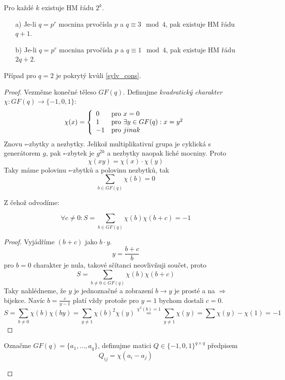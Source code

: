 \begin{consequence}
    Pro každé $k$ existuje HM řádu $2^k$.
\end{consequence}
\begin{theorem}
    \begin{itemize}
        \item[a)] Je-li $q=p^r$ mocnina prvočísla $p$ a $q\equiv 3\mod 4$, pak existuje HM řádu $q+1$.
        \item[b)] Je-li $q=p^r$ mocnina prvočísla $p$ a $q\equiv 1\mod 4$, pak existuje HM řádu $2q+2$.
    \end{itemize}
    Případ pro $q = 2$ je pokrytý kvůli \cref{sylv_cons}.
\end{theorem}
\begin{proof}
	Vezměme konečné těleso $GF(q)$.
	Definujme \emph{kvadratický charakter} $\chi:GF(q) \to \{ -1, 0, 1 \}$:
	\[ \chi(x) = \left\{ \begin{array}{lll} 0 & \mbox{pro } x = 0 \\ 1 & \mbox{pro } \exists y \in GF(q): x = y^2 \\ -1 & \mbox{pro } jinak \end{array} \right. \]
	Znovu $\square$-zbytky a nezbytky.
	Jelikož multiplikativní grupa je cyklická s generátorem $g$, pak $\square$-zbytek je $g^{2k}$ a nezbytky naopak liché mocniny.
	Proto
	\[ \chi (xy) = \chi(x) \cdot \chi(y) \]
	Taky máme polovinu $\square$-zbytků a polovinu nezbytků, tak
	\begin{equation}\label{chi_all}
		\sum_{b \in GF(q)} \chi(b) = 0
	\end{equation}

	Z čehož odvodíme:
	\begin{lemma}\label{chi_lemma}
		\[ \forall c \ne 0: S = \sum_{b \in GF(q)} \chi(b) \chi(b + c)= -1 \]
	\end{lemma}
	\begin{proof}
		Vyjádříme $(b + c)$ jako $b \cdot y$.
		\[ y = \frac{b + c}{b} \]
		pro $b = 0$ charakter je nula, takové sčítanci neovlivňuji součet, proto
		\[ S = \sum_{b \ne 0 \in GF(q)} \chi(b) \chi(b + c) \]
		Taky nahlédneme, že $y$ je jednoznačné a zobrazení $b \to y$ je prosté a na $\Rightarrow$ bijekce.
		Navíc $b = \frac{c}{y - 1}$ platí vždy protože pro $y = 1$ bychom dostali $c = 0$.
		\[ S = \sum_{b \ne 0} \chi(b) \chi(by)= \sum_{y \ne 1} \chi(b)^2 \chi(y) \stackrel{\chi^2(b) = 1}{=} \sum_{y \ne 1} \chi(y) = \sum \chi(y) - \chi(1) = -1 \]
	\end{proof}

	\begin{definition}\label{char_q}
		Označme $GF(q) = \{ a_1, \ldots, a_q \}$, definujme matici $Q \in \{ -1, 0, 1 \}^{q \times q}$ předpisem
		\[ Q_{ij} = \chi(a_i - a_j) \]
	\end{definition}


\end{proof}
